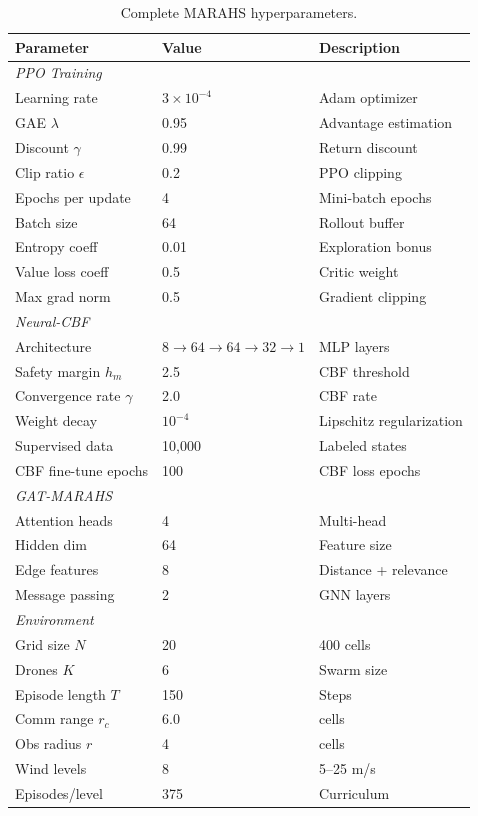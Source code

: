 \documentclass[12pt,a4paper]{article}
\begin{document}
\begin{table}[t]
\centering
\caption{Complete MARAHS hyperparameters.}
\label{tab:hyperparams}
\small
\begin{tabular}{lll}
\toprule
\textbf{Parameter} & \textbf{Value} & \textbf{Description} \\
\midrule
\multicolumn{3}{l}{\textit{PPO Training}} \\
\midrule
Learning rate & $3 \times 10^{-4}$ & Adam optimizer \\
GAE $\lambda$ & 0.95 & Advantage estimation \\
Discount $\gamma$ & 0.99 & Return discount \\
Clip ratio $\epsilon$ & 0.2 & PPO clipping \\
Epochs per update & 4 & Mini-batch epochs \\
Batch size & 64 & Rollout buffer \\
Entropy coeff & 0.01 & Exploration bonus \\
Value loss coeff & 0.5 & Critic weight \\
Max grad norm & 0.5 & Gradient clipping \\
\midrule
\multicolumn{3}{l}{\textit{Neural-CBF}} \\
\midrule
Architecture & $8 \to 64 \to 64 \to 32 \to 1$ & MLP layers \\
Safety margin $h_m$ & 2.5 & CBF threshold \\
Convergence rate $\gamma$ & 2.0 & CBF rate \\
Weight decay & $10^{-4}$ & Lipschitz regularization \\
Supervised data & 10,000 & Labeled states \\
CBF fine-tune epochs & 100 & CBF loss epochs \\
\midrule
\multicolumn{3}{l}{\textit{GAT-MARAHS}} \\
\midrule
Attention heads & 4 & Multi-head \\
Hidden dim & 64 & Feature size \\
Edge features & 8 & Distance + relevance \\
Message passing & 2 & GNN layers \\
\midrule
\multicolumn{3}{l}{\textit{Environment}} \\
\midrule
Grid size $N$ & 20 & 400 cells \\
Drones $K$ & 6 & Swarm size \\
Episode length $T$ & 150 & Steps \\
Comm range $r_c$ & 6.0 & cells \\
Obs radius $r$ & 4 & cells \\
Wind levels & 8 & 5--25 m/s \\
Episodes/level & 375 & Curriculum \\
\bottomrule
\end{tabular}
\end{table}
\end{document}

